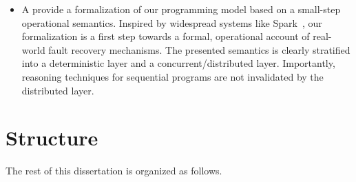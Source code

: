 \begin{itemize}
    \item A provide a formalization of our programming model based on a small-step operational semantics. Inspired by widespread
systems like Spark~\cite{Spark}, our formalization is a first step towards a
formal, operational account of real-world fault recovery mechanisms. The
presented semantics is clearly stratified into a deterministic layer and a
concurrent/distributed layer. Importantly, reasoning techniques for sequential
programs are not invalidated by the distributed layer.


\end{itemize}

\section{Structure}

The rest of this dissertation is organized as follows.


